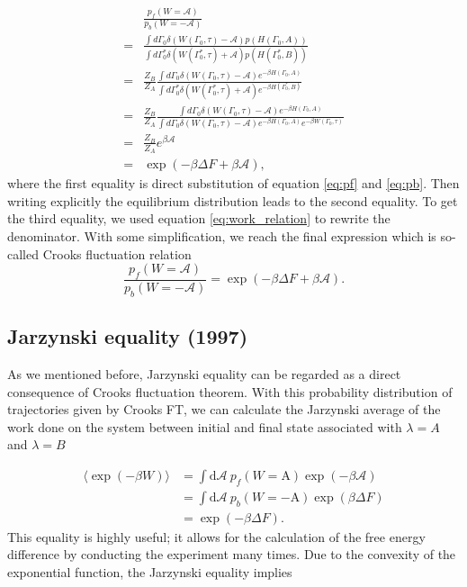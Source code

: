 \documentclass[ reprint, amsmath,amssymb, aps,]{revtex4-1}
\begin{document}
\begin{equation}
\begin{split}
&\frac{p_f(W=\mathcal{A})}{p_b(W=-\mathcal{A})}\\
=&\frac{\int d\Gamma_0\delta(W(\Gamma_0,\tau)-\mathcal{A}) p(H(\Gamma_0,A))}{\int d\Gamma_0^*\delta(W(\Gamma_0^*,\tau)+\mathcal{A}) p(H(\Gamma_0^*,B))}\\
=&\frac{Z_B}{Z_A}\frac{\int d\Gamma_0\delta(W(\Gamma_0,\tau)-\mathcal{A}) e^{-\beta H(\Gamma_0, A)}}{\int d\Gamma_0^*\delta(W(\Gamma_0^*,\tau)+\mathcal{A}) e^{-\beta H(\Gamma_0^*,B)}}\\
=&\frac{Z_B}{Z_A}\frac{\int d\Gamma_0\delta(W(\Gamma_0,\tau)-\mathcal{A}) e^{-\beta H(\Gamma_0, A)}}{\int d\Gamma_0\delta(W(\Gamma_0,\tau)-\mathcal{A}) e^{-\beta H(\Gamma_0,A)}e^{-\beta W(\Gamma_0,\tau)}}\\
=&\frac{Z_B}{Z_A}e^{\beta \mathcal{A}}\\
=&\exp\left({-\beta\Delta F+\beta \mathcal{A}}\right),
\end{split}
\end{equation}
where the first equality is direct substitution of equation \ref{eq:pf} and \ref{eq:pb}. Then writing explicitly the equilibrium distribution leads to the second equality. To get the third equality, we used equation \ref{eq:work_relation} to rewrite the denominator. With some simplification, we reach the final expression which is so-called Crooks fluctuation relation
\begin{equation}
\frac{p_f(W=\mathcal{A})}{p_b(W=-\mathcal{A})}=\exp\left({-\beta\Delta F+\beta \mathcal{A}}\right).
\end{equation}
\subsection{Jarzynski equality (1997)}
As we mentioned before, Jarzynski equality can be regarded as a direct consequence of Crooks fluctuation theorem. With this probability distribution of trajectories given by Crooks FT, we can calculate the Jarzynski average of the work done on the system between initial and final state associated with $\lambda = A$ and $\lambda = B$

\begin{equation}
\begin{split}
\langle \exp(-\beta W)\rangle &
= \int \mathrm{d}\mathcal{A}\  p_f(W=\mathrm{A})\exp(-\beta\mathcal{A})\\
&=\int\mathrm{d}\mathcal{A}\  p_b(W=-\mathrm{A})\exp(\beta\Delta F)\\
&=\exp(-\beta\Delta F).
\end{split}
\end{equation}
This equality is highly useful; it allows for the calculation of the free energy difference by conducting the experiment many times. Due to the convexity of the exponential function, the Jarzynski equality implies
\end{document}
